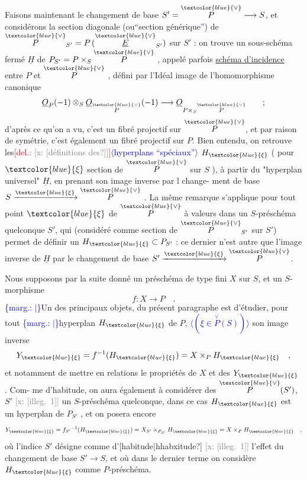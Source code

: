 \documentclass[11pt]{article}
\newcommand{\scanpage}[1]{\par\bigskip\noindent{\small\sffamily[scan #1]}\par}
\newcommand{\mspage}[1]{{\small\sffamily[p.\,#1]}}
\newcommand{\hand}[1]{\textcolor{blue}{#1}}
\let\over\relax
\newcommand{\over}[2]{\textcolor{gray}{#1}\textcolor{blue}{\ensuremath{^{\!\nearrow}}#2}}
\newcommand{\inserted}[2][]{\textcolor{blue}{$\langle$#2$\rangle$}}
\newcommand{\margin}[1]{\textcolor{blue}{\{\textsf{marg.:} #1\}}}
\newcommand{\deleted}[1]{\textcolor{red}{[\textsf{del.:} #1]}}
\newcommand{\xout}[1]{\textcolor{gray}{[\textsf{x:} #1]}}
\newcommand{\uline}[1]{\underline{#1}}
\newcommand{\unsure}[1]{[#1?]}
\newcommand{\illegible}[1]{[\textsf{illeg.\ #1}]}
\begin{document}
\mspage{5}

\clearpage
\scanpage{25/6}
\mspage{3}

Faisons maintenant le changement de base $S'=\overset{\hand{\vee}}{P}\longrightarrow S$, et considérons
la section diagonale (ou\hand{``}section générique\hand{''}) de $\overset{\hand{\vee}}{P}_{S'} = P\,(\overset{\hand{\vee}}{\underline{E}}_{S'})$ sur $S'$ :
on trouve un sous-schéma fermé $\underline{H}$ de $P_{S'} = P\times_S\overset{\hand{\vee}}{P}$ , appelé parfois
\uline{schéma d'incidence} entre $P$ et $\overset{\hand{\vee}}{P}$ , défini par l'Idéal image de
l'homomorphisme canonique
\[ \underline{O}_P(-1)\otimes_S\underline{O}_{\overset{\hand{\vee}}{P}}(-1)\longrightarrow \underline{O}_{P\times_S\overset{\hand{\vee}}{P}} \qquad ; \]
d'après ce qu'on a vu, c'est un fibré projectif sur $\overset{\hand{\vee}}{P}$, et par raison de
symétrie, c'est également un fibré projectif sur $P$. Bien entendu, on
retrouve les\deleted{\xout{\unsure{définitions des}}}\inserted{hyperplans ``spéciaux''} $H_{\hand{\xi}}$ ( pour $\hand{\xi}$ section de $\overset{\hand{\vee}}{P}$ sur $S$ )\hand{,} à partir
du "hyperplan universel" $\underline{H}$\hand{,} en prenant son image inverse par l\over{a}{e} change-%
ment de base $S\xrightarrow{\hand{\xi}}\overset{\hand{\vee}}{P}$ . La même remarque s'applique pour tout point
$\hand{\xi}$ de $\overset{\hand{\vee}}{P}$ à valeurs dans un $S$-préschéma quelconque $S'$, qui (considéré comme
section de $\overset{\hand{\vee}}{P}_{S'}$ sur $S'$) permet de définir un $H_{\hand{\xi}}\subset P_{S'}$ : ce dernier n'est
autre que l'image inverse de $\underline{H}$ par le changement de base $S'\xrightarrow{\hand{\xi}}\overset{\hand{\vee}}{P}$.

Nous supposons par la suite donné un préschéma de type fini $X$ sur $S$,
et un $S$-morphisme
\[ f\colon X\longrightarrow P \quad . \]
\margin{$|$}Un des principaux objets\hand{,} du présent paragraphe est d'étudier, pour tout
\margin{$|$}hyperplan $H_{\hand{\xi}}$ de $P$, \inserted{$(\xi\in\overset{\vee}{P}(S))$} son image inverse
\[ Y_{\hand{\xi}} = f^{-1}(H_{\hand{\xi}}) = X\times_P H_{\hand{\xi}} \quad , \]
et notamment de mettre en relations le propriétés de $X$ et des $Y_{\hand{\xi}}$ . Com-%
me d'habitude, on aura également à considérer des $\overset{\hand{\vee}}{P}(S')$, $S'$ \xout{\illegible{1}}
un $S$-préschéma quelconque, dans ce cas $H_{\hand{\xi}}$ est un hyperplan de $P_{S'}$ \hand{,}
et on posera encore
\[ Y_{\hand{\xi}} = f_{S'}{}^{-1}(H_{\hand{\xi}}) = X_{S'}\times_{P_{S'}}H_{\hand{\xi}} = X\times_P H_{\hand{\xi}} \quad , \]
où l'indice $S'$ désigne comme d'\unsure{habitude|hhabxitude} \xout{\illegible{1}} l'effet du changement de base
$S'\longrightarrow S$, et où dans le dernier terme on considère $H_{\hand{\xi}}$ comme $P$-préschéma.
\end{document}
